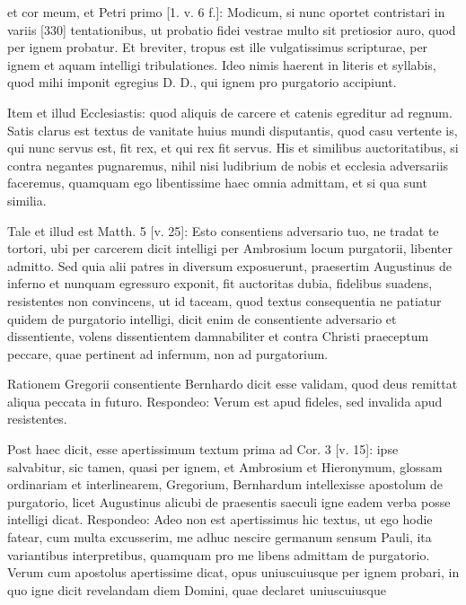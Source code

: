 et cor meum, et Petri primo [1. v. 6 f.]: Modicum, si nunc oportet contristari in variis [330] tentationibus, ut probatio fidei vestrae multo sit pretiosior auro, quod per ignem probatur. Et breviter, tropus est ille vulgatissimus scripturae, per ignem et aquam intelligi tribulationes. Ideo nimis haerent in literis et syllabis, quod mihi imponit egregius D. D., qui ignem pro purgatorio accipiunt.

Item et illud Ecclesiastis: quod aliquis de carcere et catenis egreditur ad regnum. Satis clarus est textus de vanitate huius mundi disputantis, quod casu vertente is, qui nunc servus est, fit rex, et qui rex fit servus. His et similibus auctoritatibus, si contra negantes pugnaremus, nihil nisi ludibrium de nobis et ecclesia adversariis faceremus, quamquam ego libentissime haec omnia admittam, et si qua sunt similia.

Tale et illud est Matth. 5 [v. 25]: Esto consentiens adversario tuo, ne tradat te tortori, ubi per carcerem dicit intelligi per Ambrosium locum purgatorii, libenter admitto. Sed quia alii patres in diversum exposuerunt, praesertim Augustinus de inferno et nunquam egressuro exponit, fit auctoritas dubia, fidelibus suadens, resistentes non convincens, ut id taceam, quod textus consequentia ne patiatur quidem de purgatorio intelligi, dicit enim de consentiente adversario et dissentiente, volens dissentientem damnabiliter et contra Christi praeceptum peccare, quae pertinent ad infernum, non ad purgatorium.

Rationem Gregorii consentiente Bernhardo dicit esse validam, quod deus remittat aliqua peccata in futuro. Respondeo: Verum est apud fideles, sed invalida apud resistentes.

Post haec dicit, esse apertissimum textum prima ad Cor. 3 [v. 15]: ipse salvabitur, sic tamen, quasi per ignem, et Ambrosium et Hieronymum, glossam ordinariam et interlinearem, Gregorium, Bernhardum intellexisse apostolum de purgatorio, licet Augustinus alicubi de praesentis saeculi igne eadem verba posse intelligi dicat. Respondeo: Adeo non est apertissimus hic textus, ut ego hodie fatear, cum multa excusserim, me adhuc nescire germanum sensum Pauli, ita variantibus interpretibus, quamquam pro me libens admittam de purgatorio. Verum cum apostolus apertissime dicat, opus uniuscuiusque per ignem probari, in quo igne dicit revelandam diem Domini, quae declaret uniuscuiusque

